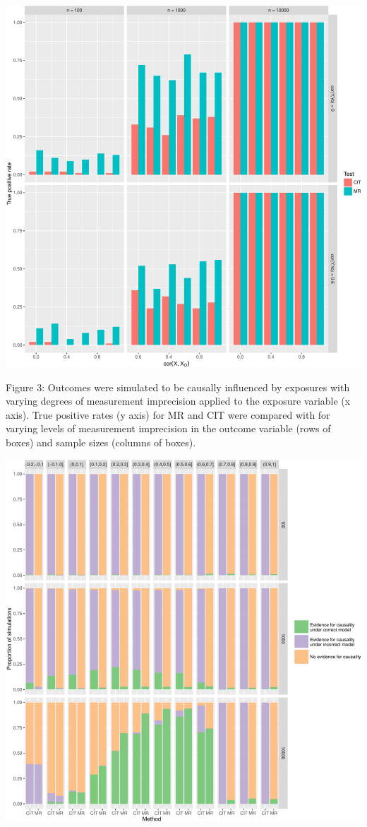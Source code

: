\documentclass[]{article}
\begin{document}
\includegraphics{manuscript_files/figure-latex/causality_exists_tpr-1.pdf}

Figure 3: Outcomes were simulated to be causally influenced by exposures
with varying degrees of measurement imprecision applied to the exposure
variable (x axis). True positive rates (y axis) for MR and CIT were
compared with for varying levels of measurement imprecision in the
outcome variable (rows of boxes) and sample sizes (columns of boxes).

\newpage

\includegraphics{manuscript_files/figure-latex/cit_mr_comparison_figure-1.pdf}
\end{document}
